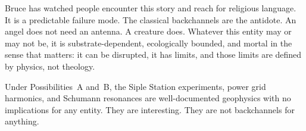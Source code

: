 Bruce has watched people encounter this story and reach for religious language. It is a predictable failure mode. The classical backchannels are the antidote. An angel does not need an antenna. A creature does. Whatever this entity may or may not be, it is substrate-dependent, ecologically bounded, and mortal in the sense that matters: it can be disrupted, it has limits, and those limits are defined by physics, not theology.

Under Possibilities~A and~B, the Siple Station experiments, power grid harmonics, and Schumann resonances are well-documented geophysics with no implications for any entity. They are interesting. They are not backchannels for anything.
%
%
%
%
%

\chapterreturn
